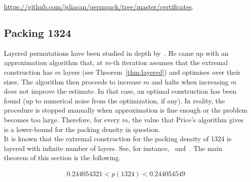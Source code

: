 \url{https://github.com/jsliacan/permpack/tree/master/certificates}.



\subsection{Packing 1324}
Layered permutations have been studied in depth by~\cite{price1997packing}. He came up with an approximation algorithm that, at $m$-th iteration assumes that the extremal construction has $m$ layers (see Theorem~\ref{thm:layered}) and optimises over their sizes. The algorithm then proceeds to increase $m$ and halts when increasing $m$ does not improve the estimate. In that case, an optimal construction has been found (up to numerical noise from the optimization, if any). In reality, the procedure is stopped manually when approximation is fine enough or the problem becomes too large. Therefore, for every $m$, the value that Price's algorithm gives is a lower-bound for the packing density in question. \\

It is known that the extremal construction for the packing density of 1324 is layered with infinite number of layers. See, for instance,~\cite{albert2002packing} and~\cite{price1997packing}. The main theorem of this section is the following. 
\begin{theorem}
\label{thm:pack1324}
\begin{align*}
0.244054321 < p(1324) < 0.244054549
\end{align*}
\end{theorem}

